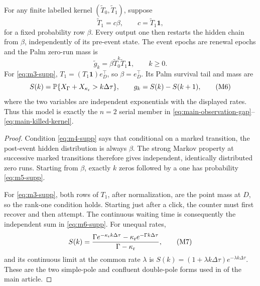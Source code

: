 \begin{proposition}
\label{prop:rank-one-renewal-supp}
For any finite labelled kernel \((\widetilde T_0,\widetilde T_1)\), suppose
\[
 \widetilde T_1=c\beta,\qquad c=\widetilde T_1\mathbf1,
\tag{M4}\label{eq:m4-supp}
\]
for a fixed probability row \(\beta\).  Every output one then restarts the
hidden chain from \(\beta\), independently of its pre-event state.  The event
epochs are renewal epochs and the Palm zero-run mass is
\[
 \widetilde g_k=\beta\widetilde T_0^k
 \widetilde T_1\mathbf1,\qquad k\ge0.
\tag{M5}\label{eq:m5-supp}
\]
For \eqref{eq:m3-supp}, \(T_1=(T_1\mathbf1)e_D^\top\), so \(\beta=e_D^\top\).
Its Palm survival tail and mass are
\[
 S(k)=\mathbb P\{X_\Gamma+X_{\kappa_{\rm r}}>k\Delta\tau\},
 \qquad g_k=S(k)-S(k+1),
\tag{M6}\label{eq:m6-supp}
\]
where the two variables are independent exponentials with the displayed
rates.  Thus this model is exactly the \(n=2\) serial member in
\eqref{eq:main-observation-gap}--\eqref{eq:main-killed-kernel}.
\end{proposition}

\begin{proof}
Condition \eqref{eq:m4-supp} says that conditional on a marked transition, the
post-event hidden distribution is always \(\beta\).  The strong Markov
property at successive marked transitions therefore gives independent,
identically distributed zero runs.  Starting from \(\beta\), exactly \(k\)
zeros followed by a one has probability \eqref{eq:m5-supp}.

For \eqref{eq:m3-supp}, both rows of \(T_1\), after normalization, are the point
mass at \(D\), so the rank-one condition holds.  Starting just after a click,
the counter must first recover and then attempt.  The continuous waiting time
is consequently the independent sum in \eqref{eq:m6-supp}.  For unequal rates,
\[
 S(k)=\frac{\Gamma e^{-\kappa_{\rm r}k\Delta\tau}
 -\kappa_{\rm r}e^{-\Gamma k\Delta\tau}}
 {\Gamma-\kappa_{\rm r}},
\tag{M7}\label{eq:m7-supp}
\]
and its continuous limit at the common rate \(\lambda\) is
\(S(k)=(1+\lambda k\Delta\tau)e^{-\lambda k\Delta\tau}\).  These are the
two simple-pole and confluent double-pole forms used in
 of the main article.
\end{proof}
